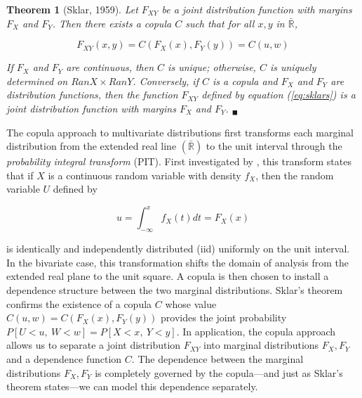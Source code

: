\documentclass[12pt]{article}
\newtheorem{thm}{Theorem}
\begin{document}
\begin{thm}[Sklar, 1959] \label{thm:skl}
	Let $F_{XY}$ be a joint distribution function with margins $F_{X}$ and $F_{Y}$. Then there exists a copula $C$ such that for all $x,y$ in $\bar{\mathbb{R}}$,

	\begin{equation} \label{eq:sklars}
		F_{XY}\left( x,y\right) =C\left(F_{X}\left(x\right), F_{Y}\left(y\right)\right) = C\left(u,w\right)
	\end{equation}

	If $F_{X}$ and $F_{Y}$ are continuous, then $C$ is unique; otherwise, $C$ is uniquely determined on $RanX\times RanY$. Conversely, if $C$ is a copula and $F_{X}$ and $F_{Y}$ are distribution functions, then the function $F_{XY}$ defined by equation (\ref{eq:sklars}) is a joint distribution function with margins $F_{X}$ and $F_{Y}$. $_{\blacksquare}$
\end{thm}

The copula approach to multivariate distributions first transforms each marginal distribution from the extended real line $\left(\bar{\mathbb{R}}\right)$ to the unit interval through the \textit{probability integral transform} (PIT). First investigated by \cite{Rosenblatt_1952}, this transform states that if $X$ is a continuous random variable with density $f_{X}$, then the random variable $U$ defined by

\begin{equation} \label{eqn:PIT}
	u=\int_{-\infty}^{x}f_{X}\left(t\right) dt=F_{X}\left(x\right)
\end{equation}

is identically and independently distributed (iid) uniformly on the unit interval. In the bivariate case, this transformation shifts the domain of analysis from the extended real plane to the unit square. A copula is then chosen to install a dependence structure between the two marginal distributions. Sklar's theorem confirms the existence of a copula $C$ whose value $C\left(u,w\right) = C\left(F_{X}\left(x\right), F_{Y}\left(y\right)\right)$ provides the joint probability $P\left[U < u,~W < w\right] = P\left[X < x,~Y < y\right]$. In application, the copula approach allows us to separate a joint distribution $F_{XY}$ into marginal distributions $F_{X},F_{Y}$ and a dependence function $C$. The dependence between the marginal distributions $F_{X},F_{Y}$ is completely governed by the copula---and just as Sklar's theorem states---we can model this dependence separately.
\end{document}
